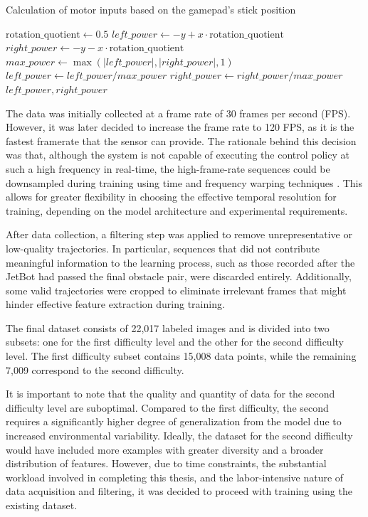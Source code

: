 \begin{algorithm}
  \caption{Calculation of motor inputs based on the gamepad's stick position}
  \begin{algorithmic}[1]
    \State $\text{rotation\_quotient} \gets 0.5$
    \State $left\_power \gets -y + x \cdot \text{rotation\_quotient}$
    \State $right\_power \gets -y - x \cdot \text{rotation\_quotient}$
    \State $max\_power \gets \max\left( \left|left\_power\right|, \left|right\_power\right|, 1 \right)$
    \State $left\_power \gets left\_power / max\_power$
    \State $right\_power \gets right\_power / max\_power$
    \State \Return $left\_power, right\_power$
    \EndFunction
  \end{algorithmic}
  \label{alg:motor_inputs}
\end{algorithm}

The data was initially collected at a frame rate of 30 frames per second (FPS). However, it was later decided to increase the frame rate to 120 FPS, as it is the fastest framerate that the sensor can provide. The rationale behind this decision was that, although the system is not capable of executing the control policy at such a high frequency in real-time, the high-frame-rate sequences could be downsampled during training using time and frequency warping techniques \autocite{iglesias2023data}. This allows for greater flexibility in choosing the effective temporal resolution for training, depending on the model architecture and experimental requirements.

After data collection, a filtering step was applied to remove unrepresentative or low-quality trajectories. In particular, sequences that did not contribute meaningful information to the learning process, such as those recorded after the JetBot had passed the final obstacle pair, were discarded entirely. Additionally, some valid trajectories were cropped to eliminate irrelevant frames that might hinder effective feature extraction during training.

The final dataset consists of 22,017 labeled images and is divided into two subsets: one for the first difficulty level and the other for the second difficulty level. The first difficulty subset contains 15,008 data points, while the remaining 7,009 correspond to the second difficulty.

It is important to note that the quality and quantity of data for the second difficulty level are suboptimal. Compared to the first difficulty, the second requires a significantly higher degree of generalization from the model due to increased environmental variability. Ideally, the dataset for the second difficulty would have included more examples with greater diversity and a broader distribution of features. However, due to time constraints, the substantial workload involved in completing this thesis, and the labor-intensive nature of data acquisition and filtering, it was decided to proceed with training using the existing dataset.


